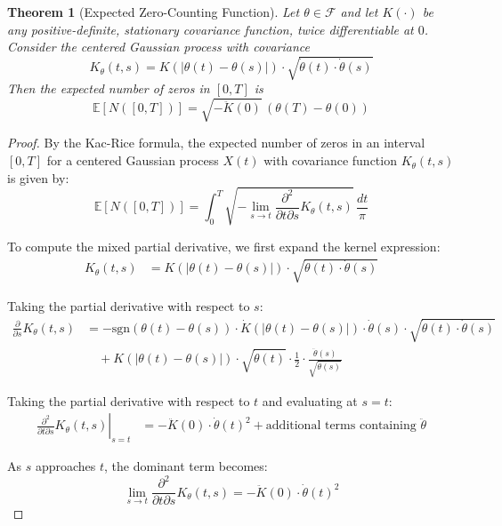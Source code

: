 \documentclass{article}
\newtheorem{theorem}{Theorem}
\newcommand{\EE}{\mathbb{E}}
\newcommand{\Fcal}{\mathcal{F}}
\newcommand{\dottheta}{\dot{\theta}}
\begin{document}
\begin{theorem}[Expected Zero-Counting Function]
Let $\theta\in\Fcal$ and let $K(\cdot)$ be any positive-definite, stationary covariance function, twice differentiable at $0$. Consider the centered Gaussian process with covariance
\begin{equation}
K_\theta(t,s) = K(|\theta(t)-\theta(s)|) \cdot \sqrt{\dottheta(t) \cdot \dottheta(s)}
\end{equation}
Then the expected number of zeros in $[0,T]$ is
\begin{equation}
\EE[N([0,T])] = \sqrt{-\ddot{K}(0)} \, (\theta(T)-\theta(0))
\end{equation}
\end{theorem}

\begin{proof}
By the Kac-Rice formula, the expected number of zeros in an interval $[0,T]$ for a centered Gaussian process $X(t)$ with covariance function $K_\theta(t,s)$ is given by:
\begin{equation}
\EE[N([0,T])] = \int_0^T \sqrt{-\lim_{s\to t} \frac{\partial^2}{\partial t \partial s} K_\theta(t,s)} \, \frac{dt}{\pi}
\end{equation}

To compute the mixed partial derivative, we first expand the kernel expression:
\begin{align}
K_\theta(t,s) &= K(|\theta(t)-\theta(s)|) \cdot \sqrt{\dottheta(t) \cdot \dottheta(s)}
\end{align}

Taking the partial derivative with respect to $s$:
\begin{align}
\frac{\partial}{\partial s}K_\theta(t,s) &= -\text{sgn}(\theta(t)-\theta(s)) \cdot \dot{K}(|\theta(t)-\theta(s)|) \cdot \dottheta(s) \cdot \sqrt{\dottheta(t) \cdot \dottheta(s)}\\
&\quad + K(|\theta(t)-\theta(s)|) \cdot \sqrt{\dottheta(t)} \cdot \frac{1}{2} \cdot \frac{\ddot{\theta}(s)}{\sqrt{\dottheta(s)}}
\end{align}

Taking the partial derivative with respect to $t$ and evaluating at $s=t$:
\begin{align}
\left.\frac{\partial^2}{\partial t \partial s}K_\theta(t,s)\right|_{s=t} &= -\ddot{K}(0) \cdot \dottheta(t)^2 + \text{additional terms containing } \ddot{\theta}
\end{align}

As $s$ approaches $t$, the dominant term becomes:
\begin{equation}
\lim_{s\to t} \frac{\partial^2}{\partial t \partial s} K_\theta(t,s) = -\ddot{K}(0) \cdot \dottheta(t)^2
\end{equation}


\end{proof}
\end{document}
